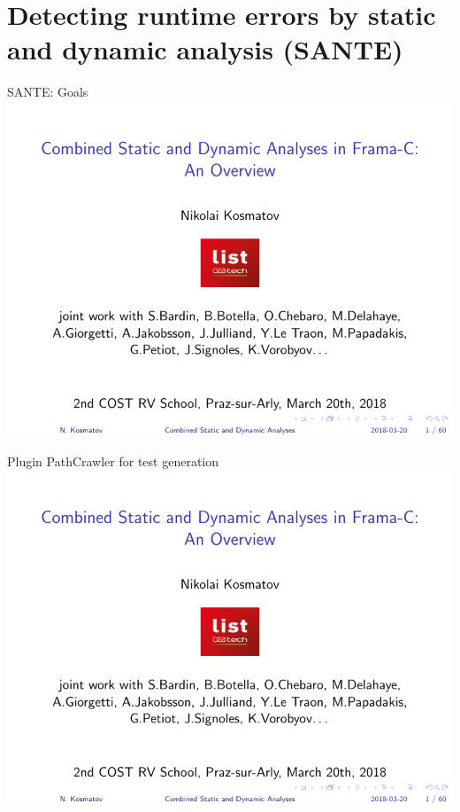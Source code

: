 \section{Detecting runtime errors by static and dynamic analysis (SANTE)}


\begin{frame}{SANTE: Goals}
  \includegraphics[page=45,width=\textwidth,trim={0cm 1cm 0cm 2cm},clip]{tutorial_2018_03_20_costrv2018.pdf}
\end{frame}


\begin{frame}{Plugin PathCrawler for test generation}
  \includegraphics[page=46,width=\textwidth,trim={0cm 1cm 0 1.5cm},clip]{tutorial_2018_03_20_costrv2018.pdf}
\end{frame}

